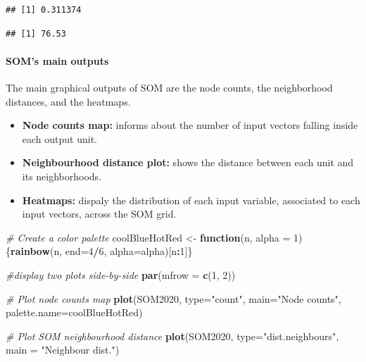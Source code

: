 \documentclass[
]{article}
\newenvironment{Shaded}{\begin{snugshade}}{\end{snugshade}}
\newcommand{\AttributeTok}[1]{\textcolor[rgb]{0.13,0.29,0.53}{#1}}
\newcommand{\CommentTok}[1]{\textcolor[rgb]{0.56,0.35,0.01}{\textit{#1}}}
\newcommand{\ControlFlowTok}[1]{\textcolor[rgb]{0.13,0.29,0.53}{\textbf{#1}}}
\newcommand{\DecValTok}[1]{\textcolor[rgb]{0.00,0.00,0.81}{#1}}
\newcommand{\FunctionTok}[1]{\textcolor[rgb]{0.13,0.29,0.53}{\textbf{#1}}}
\newcommand{\NormalTok}[1]{#1}
\newcommand{\OtherTok}[1]{\textcolor[rgb]{0.56,0.35,0.01}{#1}}
\newcommand{\SpecialCharTok}[1]{\textcolor[rgb]{0.81,0.36,0.00}{\textbf{#1}}}
\newcommand{\StringTok}[1]{\textcolor[rgb]{0.31,0.60,0.02}{#1}}
\providecommand{\tightlist}{%
  \setlength{\itemsep}{0pt}\setlength{\parskip}{0pt}}
\begin{document}
\begin{verbatim}
## [1] 0.311374
\end{verbatim}

\begin{Shaded}
\end{Shaded}

\begin{verbatim}
## [1] 76.53
\end{verbatim}

\paragraph{SOM's main outputs}\label{soms-main-outputs}

The main graphical outputs of SOM are the node counts, the neighborhood distances, and the heatmaps.

\begin{itemize}
\tightlist
\item
  \textbf{Node counts map:} informs about the number of input vectors falling inside each output unit.
\item
  \textbf{Neighbourhood distance plot:} shows the distance between each unit and its neighborhoods.
\item
  \textbf{Heatmaps:} dispaly the distribution of each input variable, associated to each input vectors, across the SOM grid.
\end{itemize}

\begin{Shaded}
\begin{Highlighting}[]
\CommentTok{\# Create a color palette}
\NormalTok{coolBlueHotRed }\OtherTok{\textless{}{-}} \ControlFlowTok{function}\NormalTok{(n, }\AttributeTok{alpha =} \DecValTok{1}\NormalTok{) \{}\FunctionTok{rainbow}\NormalTok{(n, }\AttributeTok{end=}\DecValTok{4}\SpecialCharTok{/}\DecValTok{6}\NormalTok{, }\AttributeTok{alpha=}\NormalTok{alpha)[n}\SpecialCharTok{:}\DecValTok{1}\NormalTok{]\}}

\CommentTok{\#display two plots side{-}by{-}side}
\FunctionTok{par}\NormalTok{(}\AttributeTok{mfrow =} \FunctionTok{c}\NormalTok{(}\DecValTok{1}\NormalTok{, }\DecValTok{2}\NormalTok{))}

\CommentTok{\# Plot node counts map}
\FunctionTok{plot}\NormalTok{(SOM2020, }\AttributeTok{type=}\StringTok{"count"}\NormalTok{, }\AttributeTok{main=}\StringTok{"Node counts"}\NormalTok{, }\AttributeTok{palette.name=}\NormalTok{coolBlueHotRed)}

\CommentTok{\# Plot SOM neighbourhood distance}
\FunctionTok{plot}\NormalTok{(SOM2020, }\AttributeTok{type=}\StringTok{"dist.neighbours"}\NormalTok{, }\AttributeTok{main =} \StringTok{"Neighbour dist."}\NormalTok{)}
\end{Highlighting}
\end{Shaded}
\end{document}
